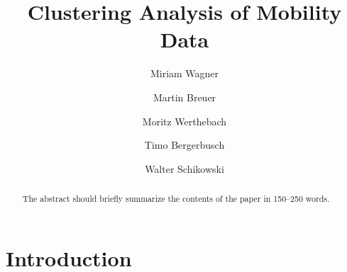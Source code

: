 \documentclass[runningheads]{llncs}
\begin{document}
	\title{Clustering Analysis of Mobility Data}
	\author{Miriam Wagner\and
		Martin Breuer\and
		Moritz Werthebach\and
		Timo Bergerbusch\and
		Walter Schikowski}
	\maketitle              %
	\begin{abstract} %
		The abstract should briefly summarize the contents of the paper in
		150--250 words.
		
	\end{abstract}
	\section{Introduction}
\end{document}
